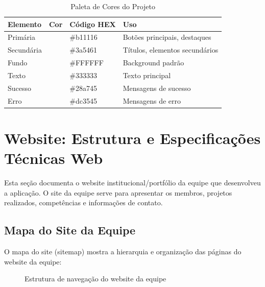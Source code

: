 \documentclass[11pt,a4paper]{article}
\begin{document}
\begin{table}[H]
\centering
\caption{Paleta de Cores do Projeto}
\label{tab:cores}
\begin{tabular}{|l|c|l|l|}
\hline
\textbf{Elemento} & \textbf{Cor} & \textbf{Código HEX} & \textbf{Uso} \\
\hline
Primária & \colorbox[HTML]{b11116}{\phantom{AAA}} & \#b11116 & Botões principais, destaques \\
Secundária & \colorbox[HTML]{3a5461}{\phantom{AAA}} & \#3a5461 & Títulos, elementos secundários \\
Fundo & \colorbox[HTML]{FFFFFF}{\phantom{AAA}} & \#FFFFFF & Background padrão \\
Texto & \colorbox[HTML]{333333}{\color{white}\phantom{AAA}} & \#333333 & Texto principal \\
Sucesso & \colorbox[HTML]{28a745}{\phantom{AAA}} & \#28a745 & Mensagens de sucesso \\
Erro & \colorbox[HTML]{dc3545}{\color{white}\phantom{AAA}} & \#dc3545 & Mensagens de erro \\
\hline
\end{tabular}
\end{table}

\section{Website: Estrutura e Especificações Técnicas Web}

Esta seção documenta o website institucional/portfólio da equipe que desenvolveu a aplicação. O site da equipe serve para apresentar os membros, projetos realizados, competências e informações de contato.

\subsection{Mapa do Site da Equipe}

O mapa do site (sitemap) mostra a hierarquia e organização das páginas do website da equipe:

\begin{figure}[H]
\centering
{}
\caption{Estrutura de navegação do website da equipe}
\label{fig:sitemap}
\end{figure}
\end{document}
